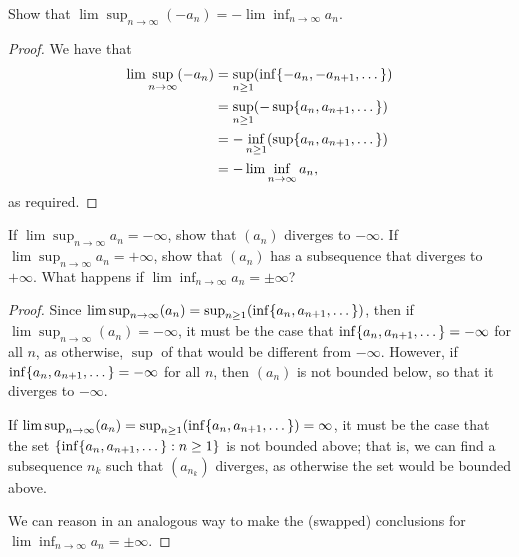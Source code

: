 \begin{exercise}{24}
Show that $\lim\sup_{n\to\infty}(-a_n)=-\lim\inf_{n\to\infty}a_n$.
\end{exercise}
\begin{proof}
We have that
\begin{align*}
    \lim\sup_{n\to\infty}(-a_n) &= \sup_{n\geq 1}(\inf\{-a_n,-a_{n+1},\dots\})\\
    &= \sup_{n\geq 1}(-\sup\{a_n,a_{n+1},\dots\})\\
    &= -\inf_{n\geq 1}(\sup\{a_n,a_{n+1},\dots\})\\
    &= -\lim\inf_{n\to\infty}a_n,
\end{align*}
as required.
\end{proof}

\begin{exercise}{25}
If $\lim\sup_{n\to\infty}a_n=-\infty$, show that $(a_n)$ diverges to $-\infty$. If $\lim\sup_{n\to\infty}a_n=+\infty$, show that $(a_n)$ has a subsequence that diverges to $+\infty$. What happens if $\lim\inf_{n\to\infty}a_n=\pm\infty$?
\end{exercise}
\begin{proof}
Since $\lim\sup_{n\to\infty}(a_n) = \sup_{n\geq 1}(\inf\{a_n,a_{n+1},\dots\})$, then if\\ $\lim\sup_{n\to\infty}(a_n)=-\infty$, it must be the case that $\inf\{a_n,a_{n+1},\dots\}=-\infty$ for all $n$, as otherwise, $\sup$ of that would be different from $-\infty$. However, if $\inf\{a_n,a_{n+1},\dots\}=-\infty$ for all $n$, then $(a_n)$ is not bounded below, so that it diverges to $-\infty$.

If $\lim\sup_{n\to\infty}(a_n)= \sup_{n\geq 1}(\inf\{a_n,a_{n+1},\dots\})= \infty$, it must be the case that the set $\{\inf\{a_n,a_{n+1},\dots\}:n\geq 1\}$ is not bounded above; that is, we can find a subsequence $n_k$ such that $(a_{n_k})$ diverges, as otherwise the set would be bounded above. 

We can reason in an analogous way to make the (swapped) conclusions for $\lim\inf_{n\to\infty}a_n=\pm\infty$.
\end{proof}

